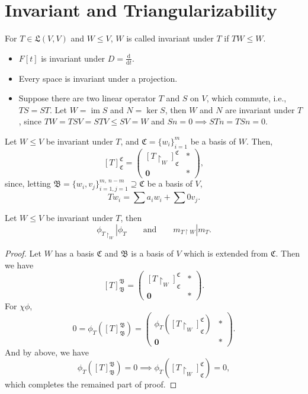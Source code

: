 \section{Invariant and Triangularizability}
\begin{defn}
  For $T\in\mathfrak L(V,V)$ and $W\le V$, $W$ is called invariant under $T$ if $TW \le W.$
\end{defn}
\begin{ex}
  \begin{itemize}
    \item $F[t]$ is invariant under $D = \frac{\mathrm d}{\mathrm dt}.$
    \item Every space is invariant under a projection.
    \item Suppose there are two linear operator $T$ and $S$ on $V$, which commute, i.e., $TS = ST$. Let $W = \operatorname{im} S$ and $N = \ker S$, then $W$ and $N$ are invariant under $T$, since $TW = TSV = STV \le SV = W$ and $Sn = 0 \implies STn = TSn = 0.$
  \end{itemize}
\end{ex}
Let $W\le V$ be invariant under $T$, and $\mathfrak C = \{w_i\}_{i=1}^m$ be a basis of $W$. Then, $$[T]_{\mathfrak C}^{\mathfrak C} = \begin{pmatrix}[T\upharpoonright _W]^{\mathfrak C}_{\mathfrak C} & * \\ \mathbf 0 & *\end{pmatrix},$$ since, letting $\mathfrak B = \{w_i, v_j\}_{i=1,j=1}^{m,~n-m}\supseteq \mathfrak C$ be a basis of $V$, $$Tw_i = \sum a_iw_i + \sum 0 v_j.$$

\begin{theorem}
  Let $W\le V$ be invariant under $T$, then $$\phi_{T\upharpoonright _W} | \phi_T\qquad \textrm{and}\qquad m_{T\upharpoonright W} | m_T.$$
\end{theorem}
\begin{proof}
Let $W$ has a basis $\mathfrak C$ and $\mathfrak B$ is a basis of $V$ which is extended from $\mathfrak C$. Then we have $$[T]^{\mathfrak B}_{\mathfrak B} = \begin{pmatrix}[T\upharpoonright _W]^{\mathfrak C}_{\mathfrak C}& * \\ \mathbf 0 & *\end{pmatrix}.$$ For $\chi\phi$, $$0 = \phi_T \left([T]^{\mathfrak B}_{\mathfrak B}\right) = \begin{pmatrix}\phi_T \left([T\upharpoonright _W]^{\mathfrak C}_{\mathfrak C}\right)& * \\ \mathbf 0 & *\end{pmatrix}.$$ And by above, we have $$\phi_T \left([T]^{\mathfrak B}_{\mathfrak B}\right)  = 0 \implies \phi_T \left([T\upharpoonright _W]^{\mathfrak C}_{\mathfrak C}\right)  = 0,$$ which completes the remained part of proof.
\end{proof}

